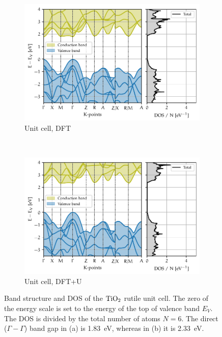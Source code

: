 \begin{figure}
    \centering
    \begin{subfigure}[t]{\textwidth}
        \centering
        \includegraphics[width=\textwidth]{figures/unit.pdf}
        \caption{Unit cell, DFT}
        \label{fig:bands_unit_dft}
    \end{subfigure}
    \\
    \begin{subfigure}[t]{\textwidth}
        \centering
        \includegraphics[width=\textwidth]{figures/unit+u.pdf}     \caption{Unit cell, DFT+U}
        \label{fig:bands_unit_dft+u}
    \end{subfigure}
    \caption[Band structure and DOS of the $\ce{TiO_2}$ rutile unit cell]{Band structure and DOS of the $\ce{TiO_2}$ rutile unit cell. The zero of the energy scale is set to the energy of the top of valence band $E_V$. The DOS is divided by the total number of atoms $N = 6$.
        The direct ($\Gamma - \Gamma$) band gap in (a) is \SI{1.83}{eV}, whereas in (b) it is \SI{2.33}{eV}.}
    \label{fig:bands_unit}
\end{figure}

